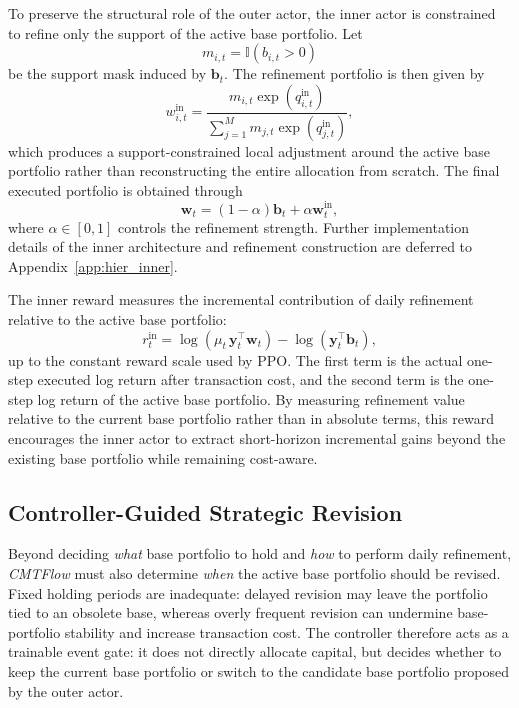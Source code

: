 \documentclass[letterpaper]{article} %
\begin{document}
To preserve the structural role of the outer actor, the inner actor is constrained to refine only the support of the active base portfolio. Let
\[
m_{i,t}
=
\mathbb{I}\!\left(b_{i,t}>0\right)
\]
be the support mask induced by \(\mathbf{b}_t\). The refinement portfolio is then given by
\[
w_{i,t}^{\mathrm{in}}
=
\frac{
m_{i,t}\exp(q_{i,t}^{\mathrm{in}})
}{
\sum_{j=1}^{M} m_{j,t}\exp(q_{j,t}^{\mathrm{in}})
},
\]
which produces a support-constrained local adjustment around the active base portfolio rather than reconstructing the entire allocation from scratch. The final executed portfolio is obtained through
\[
\mathbf{w}_t
=
(1-\alpha)\mathbf{b}_t
+
\alpha\mathbf{w}_t^{\mathrm{in}},
\]
where \(\alpha\in[0,1]\) controls the refinement strength. Further implementation details of the inner architecture and refinement construction are deferred to Appendix~\ref{app:hier_inner}.

The inner reward measures the incremental contribution of daily refinement relative to the active base portfolio:
\[
r_t^{\mathrm{in}}
=
\log\!\left(\mu_t\,\mathbf{y}_t^\top \mathbf{w}_t\right)
-
\log\!\left(\mathbf{y}_t^\top \mathbf{b}_t\right),
\]
up to the constant reward scale used by PPO. The first term is the actual one-step executed log return after transaction cost, and the second term is the one-step log return of the active base portfolio. By measuring refinement value relative to the current base portfolio rather than in absolute terms, this reward encourages the inner actor to extract short-horizon incremental gains beyond the existing base portfolio while remaining cost-aware.


\subsection{Controller-Guided Strategic Revision}

Beyond deciding \emph{what} base portfolio to hold and \emph{how} to perform daily refinement, \textit{CMTFlow} must also determine \emph{when} the active base portfolio should be revised. Fixed holding periods are inadequate: delayed revision may leave the portfolio tied to an obsolete base, whereas overly frequent revision can undermine base-portfolio stability and increase transaction cost. The controller therefore acts as a trainable event gate: it does not directly allocate capital, but decides whether to keep the current base portfolio or switch to the candidate base portfolio proposed by the outer actor.
\end{document}

